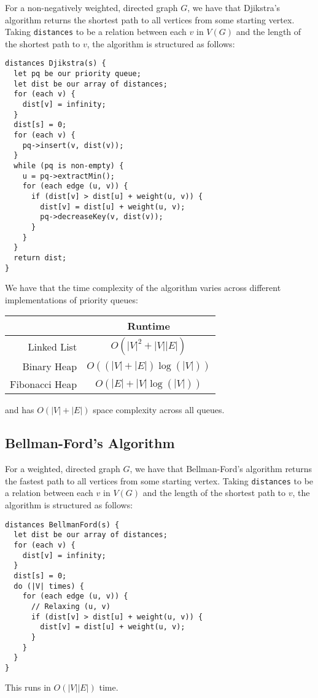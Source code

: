 For a non-negatively weighted, directed graph $G$, we have that Djikstra's 
algorithm returns the shortest path to all vertices from some starting 
vertex. Taking \texttt{distances} to be a relation between each $v$ in $V(G)$ 
and the length of the shortest path to $v$, the algorithm is structured as 
follows: \begin{lstlisting}
distances Djikstra(s) {
  let pq be our priority queue;
  let dist be our array of distances;
  for (each v) {
    dist[v] = infinity;
  }
  dist[s] = 0;
  for (each v) {
    pq->insert(v, dist(v));
  }
  while (pq is non-empty) {
    u = pq->extractMin();
    for (each edge (u, v)) {
      if (dist[v] > dist[u] + weight(u, v)) {
        dist[v] = dist[u] + weight(u, v);
        pq->decreaseKey(v, dist(v));
      }
    }
  }
  return dist;
}
\end{lstlisting} We have that the time complexity of the algorithm
varies across different implementations of priority queues: \begin{center}
  \begin{tabular} {| r || c |}
    \hline
    & Runtime \\
    \hline \hline
    Linked List & $O(|V|^2 + |V||E|)$ \\
    \hline
    Binary Heap & $O((|V| + |E|)\log{(|V|)})$ \\
    \hline
    Fibonacci Heap & $O(|E| + |V|\log{(|V|)})$ \\
    \hline
  \end{tabular}
\end{center}
and has $O(|V| + |E|)$ space complexity across all queues.

\newpage

\subsection{Bellman-Ford's Algorithm}

For a weighted, directed graph $G$, we have that Bellman-Ford's algorithm 
returns the fastest path to all vertices from some starting vertex. 
Taking \texttt{distances} to be a relation between each $v$ in $V(G)$ 
and the length of the shortest path to $v$, the algorithm is structured as 
follows: \begin{lstlisting}
distances BellmanFord(s) {
  let dist be our array of distances;
  for (each v) {
    dist[v] = infinity;
  }
  dist[s] = 0;
  do (|V| times) {
    for (each edge (u, v)) {
      // Relaxing (u, v)
      if (dist[v] > dist[u] + weight(u, v)) {
        dist[v] = dist[u] + weight(u, v);
      }
    }
  }
}
\end{lstlisting} This runs in $O(|V||E|)$ time.

